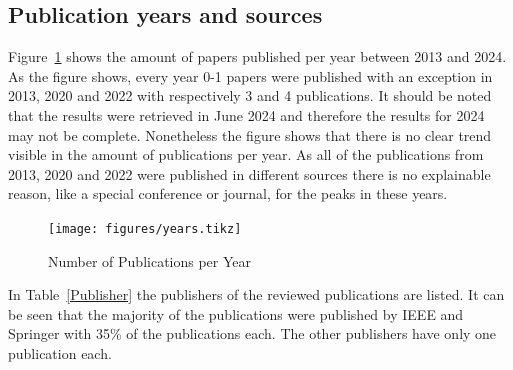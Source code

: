 \documentclass[runningheads]{llncs}
\begin{document}
\subsection{Publication years and sources}\label{years}
Figure~\ref{per_years} shows the amount of papers published per year between 2013 and 2024. As the figure shows, every year 0-1 papers were published with an exception in 2013, 2020 and 2022 with respectively 3 and 4 publications. It should be noted that the
results were retrieved in June 2024 and therefore the results for 2024 may not be complete. Nonetheless the figure shows that there is no clear trend visible in the amount of publications per year. As all of the publications from 2013, 2020 and 2022 were
published in different sources there is no explainable reason, like a special conference or journal, for the peaks in these years.\\
\begin{figure}
    \centering
    \texttt{[image: figures/years.tikz]}
    \caption{Number of Publications per Year}
    \label{per_years}
\end{figure}
In Table~\ref{Publisher} the publishers of the reviewed publications are listed. It can be seen that the majority of the publications were published by IEEE and Springer with 35\% of the
publications each. The other publishers have only one publication each.
\end{document}
